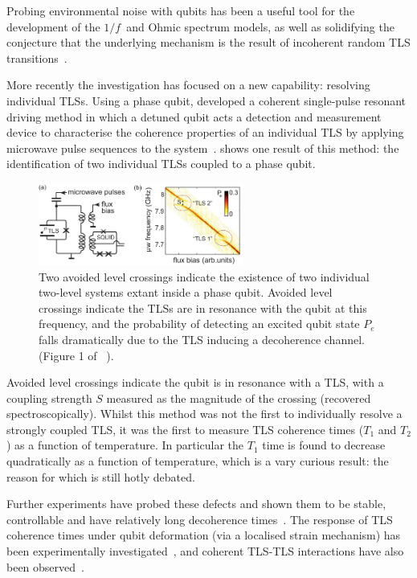 Probing environmental noise with qubits has been a useful tool for the development of the $1/f\,$ and Ohmic spectrum models, as well as solidifying the conjecture that the underlying mechanism is the result of incoherent random TLS transitions~\cite{Shnirman2005}.

More recently the investigation has focused on a new capability: resolving individual TLSs.
Using a phase qubit, \citeauthor{Lisenfeld2010} developed a coherent single-pulse resonant driving method in which a detuned qubit acts a detection and measurement device to characterise the coherence properties of an individual TLS by applying microwave pulse sequences to the system~\cite{Lisenfeld2010}.  shows one result of this method: the identification of two individual TLSs coupled to a phase qubit.

\begin{figure}[htp]
\includegraphics[width=0.6\textwidth]{figures/alclisenfeld2010}
\caption[ALC]{\label{fig:alc}Two avoided level crossings indicate the existence of two individual two-level systems extant inside a phase qubit. Avoided level crossings indicate the TLSs are in resonance with the qubit at this frequency, and the probability of detecting an excited qubit state $P_e$ falls dramatically due to the TLS inducing a decoherence channel. (Figure 1 of \citeauthor{Lisenfeld2010}~\cite{Lisenfeld2010}).}
\end{figure}

Avoided level crossings indicate the qubit is in resonance with a TLS, with a coupling strength $S$ measured as the magnitude of the crossing (recovered spectroscopically).
Whilst this method was not the first to individually resolve a strongly coupled TLS, it was the first to measure TLS coherence times ($T_1$ and $T_2$) as a function of temperature.
In particular the $T_1$ time is found to decrease quadratically as a function of temperature, which is a vary curious result: the reason for which is still hotly debated.

Further experiments have probed these defects and shown them to be stable, controllable and have relatively long decoherence times~\cite{Simmonds2004, Neeley2008, Shalibo2010, Lupascu2009, Gunnarsson2013}.
The response of TLS coherence times under qubit deformation (via a localised strain mechanism) has been experimentally investigated~\cite{Grabovskij2012}, and coherent TLS-TLS interactions have also been observed~\cite{Lisenfeld2015}.

